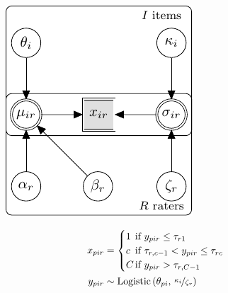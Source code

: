 \documentclass[a4paper,11pt]{article}
\begin{document}
\begin{figure}[!ht]
	\begin{minipage}{0.55\textwidth}
		\centering
		\includegraphics[width=\textwidth, page=7]{graphicalmodels.pdf}
	\end{minipage}\hfill
	\begin{minipage}{0.45\textwidth}
		{\normalsize
			\begin{align*}
			\oneScore &\assignment
			\begin{cases}
			1		&\hspace{-.3cm} \text{if } \oneAppraisal \leq \Threshold_{\Irater 1} \\
			\Incat	&\hspace{-.3cm} \text{if } \Threshold_{\Irater, \Incat-1} < \oneAppraisal \leq \Threshold_{\Irater\Incat} \\
			\Tncat	&\hspace{-.3cm} \text{if } \oneAppraisal > \Threshold_{\Irater, \Tncat-1}
			\end{cases}\\
			\oneAppraisal &\sim \dlogis{\ItemTruth_{\Ipatient\Iitem}}{\nicefrac{\ItemDifficulty_\Iitem}{\RaterCompetence_\Irater}} \\

\end{align*}}
\end{minipage}
\end{figure}
\end{document}
